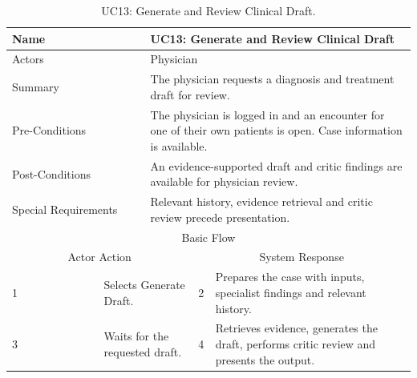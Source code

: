 \begin{table}[htbp]
\centering
\small
\caption{UC13: Generate and Review Clinical Draft.}
\label{tab:kashaf:uc13}
\begin{tabular}{|p{}|p{}|p{}|p{}|p{}|}
\hline
\multicolumn{2}{|p{\dimexpr0.225\textwidth+2\tabcolsep+\arrayrulewidth\relax}|}{Name} & \multicolumn{3}{p{\dimexpr0.575\textwidth+4\tabcolsep+2\arrayrulewidth\relax}|}{UC13: Generate and Review Clinical Draft} \\ \hline
\multicolumn{2}{|p{\dimexpr0.225\textwidth+2\tabcolsep+\arrayrulewidth\relax}|}{Actors} & \multicolumn{3}{p{\dimexpr0.575\textwidth+4\tabcolsep+2\arrayrulewidth\relax}|}{Physician} \\ \hline
\multicolumn{2}{|p{\dimexpr0.225\textwidth+2\tabcolsep+\arrayrulewidth\relax}|}{Summary} & \multicolumn{3}{p{\dimexpr0.575\textwidth+4\tabcolsep+2\arrayrulewidth\relax}|}{The physician requests a diagnosis and treatment draft for review.} \\ \hline
\multicolumn{2}{|p{\dimexpr0.225\textwidth+2\tabcolsep+\arrayrulewidth\relax}|}{Pre-Conditions} & \multicolumn{3}{p{\dimexpr0.575\textwidth+4\tabcolsep+2\arrayrulewidth\relax}|}{The physician is logged in and an encounter for one of their own patients is open. Case information is available.} \\ \hline
\multicolumn{2}{|p{\dimexpr0.225\textwidth+2\tabcolsep+\arrayrulewidth\relax}|}{Post-Conditions} & \multicolumn{3}{p{\dimexpr0.575\textwidth+4\tabcolsep+2\arrayrulewidth\relax}|}{An evidence-supported draft and critic findings are available for physician review.} \\ \hline
\multicolumn{2}{|p{\dimexpr0.225\textwidth+2\tabcolsep+\arrayrulewidth\relax}|}{Special Requirements} & \multicolumn{3}{p{\dimexpr0.575\textwidth+4\tabcolsep+2\arrayrulewidth\relax}|}{Relevant history, evidence retrieval and critic review precede presentation.} \\ \hline
\multicolumn{5}{|c|}{Basic Flow} \\ \hline
\multicolumn{3}{|c|}{Actor Action} & \multicolumn{2}{c|}{System Response} \\ \hline
1 & \multicolumn{2}{p{\dimexpr0.37\textwidth+2\tabcolsep+\arrayrulewidth\relax}|}{Selects Generate Draft.} & 2 & Prepares the case with inputs, specialist findings and relevant history. \\ \hline
3 & \multicolumn{2}{p{\dimexpr0.37\textwidth+2\tabcolsep+\arrayrulewidth\relax}|}{Waits for the requested draft.} & 4 & Retrieves evidence, generates the draft, performs critic review and presents the output. \\ \hline

\end{tabular}
\end{table}
